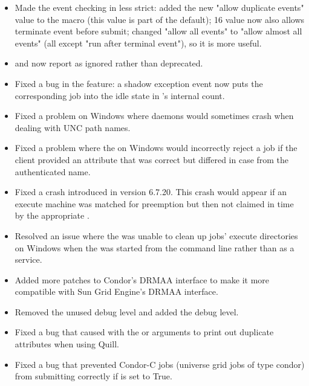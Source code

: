 \begin{itemize}
\item Made the event checking in  less strict: 
added the new "allow duplicate events" value to the
 macro (this value is part of the
default); 16 value now also allows terminate event before submit;
changed "allow all events" to "allow almost all events"
(all except "run after terminal event"), so it is more useful.

\item {} and  now report
 as ignored rather than deprecated.

\item Fixed a bug in the   feature:
a shadow exception event now puts the corresponding job into the
idle state in 's internal count.

\item Fixed a problem on Windows where daemons would sometimes crash
when dealing with UNC path names.

\item Fixed a problem where the  on Windows would
incorrectly reject a job if the client provided an 
attribute that was correct but differed in case from the authenticated
name.

\item Fixed a  crash introduced in version 6.7.20. This
crash would appear if an execute machine was matched for preemption
but then not claimed in time by the appropriate .

\item Resolved an issue where the  was unable to clean
up jobs' execute directories on Windows when the  was
started from the command line rather than as a service.

\item Added more patches to Condor's DRMAA interface to make it more
compatible with Sun Grid Engine's DRMAA interface.

\item Removed the unused  debug level and added the
   debug level.

\item Fixed a bug that caused  with the  or 
arguments to print out duplicate attributes when using Quill.

\item Fixed a bug that prevented Condor-C jobs (universe grid jobs of type condor)
from submitting correctly if  is set to
True.


\end{itemize}
